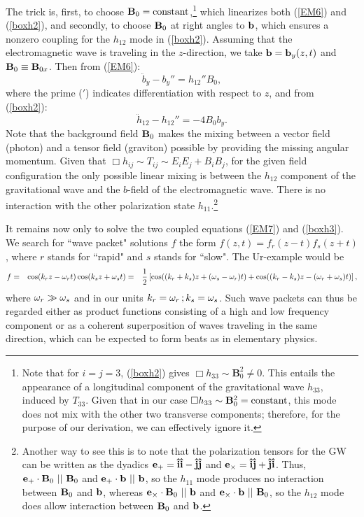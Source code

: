 \documentclass[12pt]{article}
\def\\{\hfill\break} \let\==\equiv
\def\be{\begin{equation}}
\def\ee{\end{equation}}
\def\bea{\begin{eqnarray}}\def\eea{\end{eqnarray}}
\begin{document}
The trick is, first, to choose ${\bf B}_0 = \text{constant}$,\footnote{Note  that for $i=j=3$,  (\ref{boxh2}) gives $\Box h_{33} \sim \textbf{B}_0^2 \neq 0$. This entails the appearance of a longitudinal component of the gravitational wave $h_{33}$, induced by $T_{33}$. Given that in our case $\Box h_{33} \sim {\bf B}_0^2 = \text{constant}$, this mode does not mix with the other two transverse components; therefore, for the purpose of our derivation, we can effectively ignore it.} which linearizes both (\ref{EM6}) and (\ref{boxh2}), and secondly, to choose  ${\bf B}_0$ at right angles to $\bf b$, which ensures a nonzero coupling for the $h_{12}$ mode in  (\ref{boxh2}). Assuming that the electromagnetic wave is traveling in the $z$-direction, we take ${\bf b = b}_y(z,t)$  and   ${\bf B}_0 \equiv {\bf B}_{0x}$.  Then from   (\ref{EM6}):
\be
 \ddot b_y - b_y'' = h_{12}''B_{0},\label{EM7}
\ee
where the prime ($'$) indicates differentiation with respect to $z$, and from  (\ref{boxh2}):
\be
\ddot h_{12} - h_{12}'' = - 4B_0b_y.\label{boxh3}
\ee
Note that the background field ${\bf B}_0$ makes the mixing between a vector field (photon) and a tensor field (graviton) possible by providing the missing angular momentum. Given that $\Box h_{ij} \sim T_{ij} \sim E_i E_j + B_i B_j$, for the given field configuration the only possible linear mixing is between the $h_{12}$ component of the gravitational wave and the $b$-field of the electromagnetic wave. There is no interaction with the other polarization state $h_{11}$.\footnote{Another way to see this is to note that the polarization tensors for the GW can be written as the dyadics ${\bf e}_+ = \bf \hat i\hat i-\hat j\hat j$ and ${\bf e}_\times = \bf\hat i\hat j+ \hat j\hat i$.  Thus, ${\bf e}_+ \cdot {\bf B}_0 \ || \ {\bf B}_0 $ and ${\bf e}_+ \cdot {\bf b} \ || \ {\bf b}$, so the $h_{11}$ mode produces no interaction between ${\bf B}_0$ and ${\bf b}$, whereas ${\bf e}_\times \cdot {\bf B}_0 \ || \ {\bf b}$ and ${\bf e}_\times \cdot {\bf b} \ || \ {\bf B}_0$, so the $h_{12}$ mode does allow interaction between ${\bf B}_0$ and ${\bf b}$.}


It  remains now only to solve the two coupled equations (\ref{EM7}) and (\ref{boxh3}). We search for ``wave packet" solutions $f$ the form $ f(z,t) = f_r(z-t)f_s(z+t)$, where $r$ stands for ``rapid" and $s$ stands for ``slow". The Ur-example would be
\bea
f &=& \cos(k_r z - \o_r t)\cos(k_s z + \o_s t)\nonumber \\&=& \frac{1}{2}\left[\cos((k_r + k_s)z + (\o_s - \o_r) t)+ \cos((k_r - k_s)z - (\o_r + \o_s) t)\right],\nonumber
\eea
where $\omega_r \gg \omega_s$ and in our units $k_r = \omega_r \, ; k_s = \omega_s$. Such wave packets can thus be regarded either as product functions consisting of a high and low frequency component or as a coherent superposition of waves traveling in the same direction, which can be expected to form beats as in elementary physics.
\end{document}
